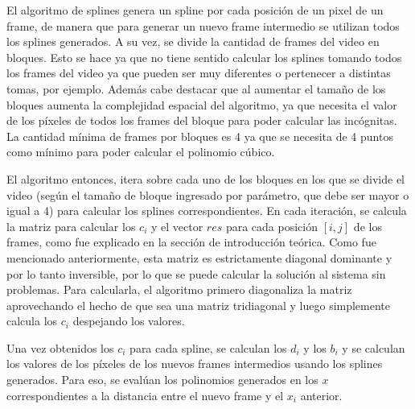 \par El algoritmo de splines genera un spline por cada posición de un pixel de un frame, de manera que para generar un nuevo frame intermedio se utilizan todos los splines generados. A su vez, se divide la cantidad de frames del video en bloques. Esto se hace ya que no tiene sentido calcular los splines tomando todos los frames del video ya que pueden ser muy diferentes o pertenecer a distintas tomas, por ejemplo. Además cabe destacar que al aumentar el tamaño de los bloques aumenta la complejidad espacial del algoritmo, ya que necesita el valor de los píxeles de todos los frames del bloque para poder calcular las incógnitas.  La cantidad mínima de frames por bloques es 4 ya que se necesita de 4 puntos como mínimo para poder calcular el polinomio cúbico.
\par El algoritmo entonces, itera sobre cada uno de los bloques en los que se divide el video (según el tamaño de bloque ingresado por parámetro, que debe ser mayor o igual a 4) para calcular los splines correspondientes. En cada iteración, se calcula la matriz para calcular los $c_i$ y el vector $res$ para cada posición $[i,j]$ de los frames, como fue explicado en la sección de introducción teórica. Como fue mencionado anteriormente, esta matriz es estrictamente diagonal dominante y por lo tanto inversible, por lo que se puede calcular la solución al sistema sin problemas. Para calcularla, el algoritmo primero diagonaliza la matriz aprovechando el hecho de que sea una matriz tridiagonal y luego simplemente calcula los $c_i$ despejando los valores.
\par Una vez obtenidos los $c_i$ para cada spline, se calculan los $d_i$ y los $b_i$ y se calculan los valores de los píxeles de los nuevos frames intermedios usando los splines generados. Para eso, se evalúan los polinomios generados en los $x$ correspondientes a la distancia entre el nuevo frame y el $x_i$ anterior. 
